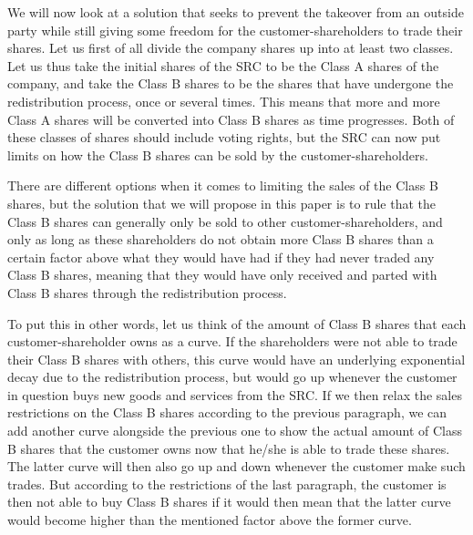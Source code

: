 \documentclass{article}
\begin{document}
We will now look at a solution that seeks to prevent the takeover from an outside party while still giving some freedom for the customer-shareholders to trade their shares. Let us first of all divide the company shares up into at least two classes. Let us thus take the initial shares of the SRC to be the Class A shares of the company, and take the Class B shares to be the shares that have undergone the redistribution process, once or several times. This means that more and more Class A shares will be converted into Class B shares as time progresses. Both of these classes of shares should include voting rights, but the SRC can now put limits on how the Class B shares can be sold by the customer-shareholders. 

There are different options when it comes to limiting the sales of the Class B shares, but the solution that we will propose in this paper is to rule that the Class B shares can generally only be sold to other customer-shareholders, and only as long as these shareholders do not obtain more Class B shares than a certain factor above what they would have had if they had 
never traded any Class B shares, meaning that they would have only received and parted with Class B shares through the redistribution process. 

To put this in other words, let us think of the amount of Class B shares that each customer-shareholder owns as a curve. If the shareholders were not able to trade their Class B shares with others, this curve would have an underlying exponential decay due to the redistribution process, but would go up whenever the customer in question buys new goods and services from the SRC. If we then relax the sales restrictions on the Class B shares according to the previous paragraph, we can add another curve alongside the previous one to show the actual amount of Class B shares that the customer owns now that he/she is able to trade these shares. The latter curve will then also go up and down whenever the customer make such trades. But according to the restrictions of the last paragraph, the customer is then not able to buy Class B shares if it would then mean that the latter curve would become higher than the mentioned factor above the former curve.
\end{document}

